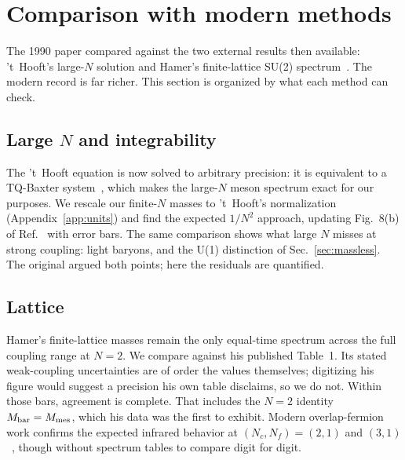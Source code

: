 \section{Comparison with modern methods}
\label{sec:modern}

The 1990 paper compared against the two external results then available:
't~Hooft's large-$N$ solution and Hamer's finite-lattice SU(2)
spectrum~\cite{Hamer:1981yq}.  The modern record is far richer.  This
section is organized by what each method can check.

\subsection{Large $N$ and integrability}
\label{sec:modern-largeN}

The 't~Hooft equation is now solved to arbitrary precision: it is
equivalent to a TQ-Baxter
system~\cite{Ambrosino:2023dik,Litvinov:2024riz}, which makes the
large-$N$ meson spectrum exact for our purposes.  We rescale our finite-$N$
masses to 't~Hooft's normalization (Appendix~\ref{app:units}) and find the
expected $1/N^2$ approach, updating Fig.~8(b) of
Ref.~\cite{Hornbostel:1988fb} with error bars.  The same comparison shows
what large $N$ misses at strong coupling: light baryons, and the U(1)
distinction of Sec.~\ref{sec:massless}.  The original argued both points;
here the residuals are quantified.

\subsection{Lattice}
\label{sec:modern-lattice}

Hamer's finite-lattice masses remain the only equal-time spectrum across
the full coupling range at $N = 2$.  We compare against his published
Table~1.  Its stated weak-coupling uncertainties are of order the values
themselves; digitizing his figure would suggest a precision his own table
disclaims, so we do not.  Within those bars, agreement is complete.  That
includes the $N = 2$ identity $M_{\rm bar} = M_{\rm mes}$, which his data
was the first to exhibit.  Modern overlap-fermion work confirms the
expected infrared behavior at $(N_c, N_f) = (2,1)$ and
$(3,1)$~\cite{Karthik:2023gud}, though without spectrum tables to compare
digit for digit.

